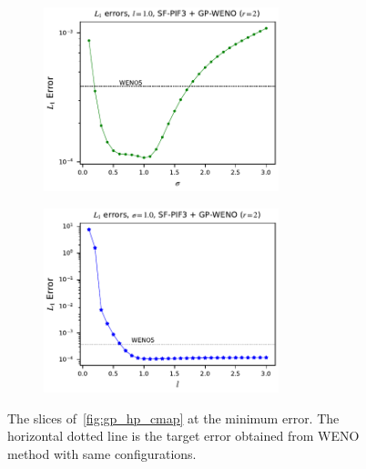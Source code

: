 \begin{figure}
    \centering
    \begin{subfigure}{\textwidth}
        \centering
        \includegraphics[width=0.75\textwidth]{fig/hp_best_ell_gp2_sf3}
    \end{subfigure}
    \par\bigskip
    \begin{subfigure}{\textwidth}
        \centering
        \includegraphics[width=0.75\textwidth]{fig/hp_best_sig_gp2_sf3}
    \end{subfigure}
    \caption{The slices of~\cref{fig:gp_hp_cmap} at the minimum error.
        The horizontal dotted line is the target error obtained from WENO method
        with same configurations.
    }\label{fig:gp_hp_best}
\end{figure}


